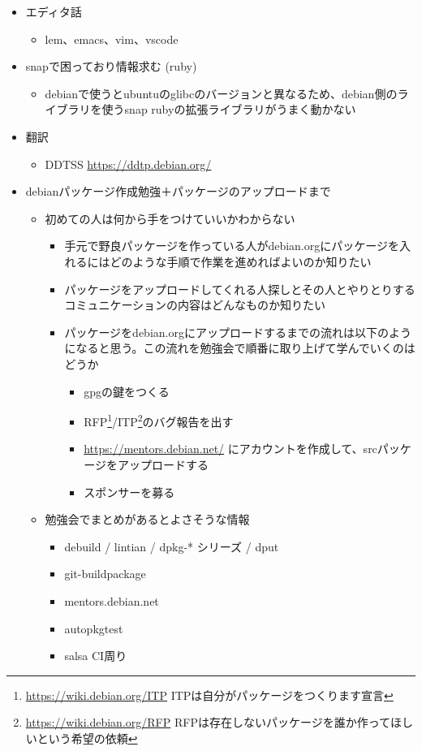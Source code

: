 \documentclass[mingoth,a4paper]{jsarticle}
\begin{document}
\begin{itemize}
\item エディタ話
  \begin{itemize}
  \item lem、emacs、vim、vscode
  \end{itemize}
\item snapで困っており情報求む (ruby)
  \begin{itemize}
  \item debianで使うとubuntuのglibcのバージョンと異なるため、debian側のライブラリを使うsnap rubyの拡張ライブラリがうまく動かない
  \end{itemize}
\item 翻訳
  \begin{itemize}
  \item DDTSS \url{https://ddtp.debian.org/}
  \end{itemize}
\item debianパッケージ作成勉強＋パッケージのアップロードまで
  \begin{itemize}
  \item 初めての人は何から手をつけていいかわからない
    \begin{itemize}
    \item 手元で野良パッケージを作っている人がdebian.orgにパッケージを入れるにはどのような手順で作業を進めればよいのか知りたい
    \item パッケージをアップロードしてくれる人探しとその人とやりとりするコミュニケーションの内容はどんなものか知りたい
    \item パッケージをdebian.orgにアップロードするまでの流れは以下のようになると思う。この流れを勉強会で順番に取り上げて学んでいくのはどうか
      \begin{itemize}
      \item gpgの鍵をつくる
      \item RFP\footnote{\url{https://wiki.debian.org/ITP}  ITPは自分がパッケージをつくります宣言}/ITP\footnote{\url{https://wiki.debian.org/RFP}  RFPは存在しないパッケージを誰か作ってほしいという希望の依頼}のバグ報告を出す
      \item \url{https://mentors.debian.net/} にアカウントを作成して、srcパッケージをアップロードする
      \item スポンサーを募る
      \end{itemize}
    \end{itemize}
  \item 勉強会でまとめがあるとよさそうな情報
    \begin{itemize}
    \item debuild / lintian / dpkg-* シリーズ / dput
    \item git-buildpackage
    \item mentors.debian.net
    \item autopkgtest
    \item salsa CI周り
    \end{itemize}
  \end{itemize}
\end{itemize}
\end{document}
